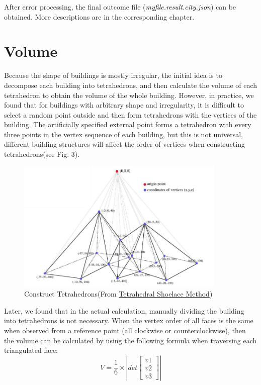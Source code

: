 \documentclass[12pt]{article}
\begin{document}
After error processing, the final outcome file (\textcolor{black}{\textit{myfile.result.city.json}}) can be obtained. More descriptions are in the corresponding chapter.

\section{Volume}
Because the shape of buildings is mostly irregular, the initial idea is to decompose each building into tetrahedrons, and then calculate the volume of each tetrahedron to obtain the volume of the whole building. However, in practice, we found that for buildings with arbitrary shape and irregularity, it is difficult to select a random point outside and then form tetrahedrons with the vertices of the building. The artificially specified external point forms a tetrahedron with every three points in the vertex sequence of each building, but this is not universal, different building structures will affect the order of vertices when constructing tetrahedrons(see Fig. 3).
\begin{figure}[ht] %
\centering
\includegraphics[width=10cm]{decompose_to_tetrahedra.png}
\caption{Construct Tetrahedrons(From \href{https://ysjournal.com/tetrahedral-shoelace-method-calculating-volume-of-irregular-solids/}{Tetrahedral Shoelace Method})}
\end{figure}
Later, we found that in the actual calculation, manually dividing the building into tetrahedrons is not necessary. When the vertex order of all faces is the same when observed from a reference point (all clockwise or counterclockwise), then the volume can be calculated by using the following formula when traversing each triangulated face:
\begin{equation} %
     V = \frac{1}{6}\times \left | det\begin{bmatrix}
    v1\\ 
    v2\\ 

    v3\end{bmatrix} \right |
\end{equation}
\end{document}
